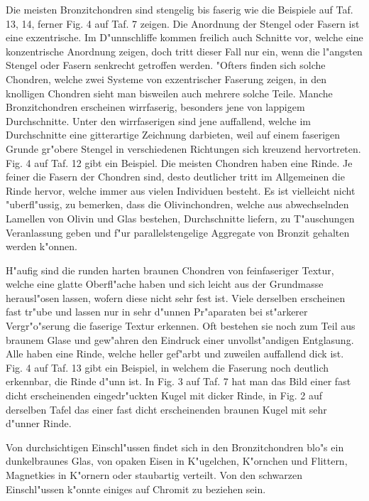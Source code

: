 \documentclass[a4paper, 11pt, oneside, polutonikogreek, german]{article}
\begin{document}
Die meisten Bronzitchondren sind stengelig bis faserig wie die Beispiele auf Taf. 13, 14, ferner Fig. 4 auf Taf. 7 zeigen. Die Anordnung der Stengel oder Fasern ist eine exzentrische. Im D"unnschliffe kommen freilich auch Schnitte vor, welche eine konzentrische Anordnung zeigen, doch tritt dieser Fall nur ein, wenn die l"angsten Stengel oder Fasern senkrecht getroffen werden. "Ofters finden sich solche Chondren, welche zwei Systeme von exzentrischer Faserung zeigen, in den knolligen Chondren sieht man bisweilen auch mehrere solche Teile. Manche Bronzitchondren erscheinen wirrfaserig, besonders jene von lappigem Durchschnitte. Unter den wirrfaserigen sind jene auffallend, welche im Durchschnitte eine gitterartige Zeichnung darbieten, weil auf einem faserigen Grunde gr"obere Stengel in verschiedenen Richtungen sich kreuzend hervortreten. Fig. 4 auf Taf. 12 gibt ein Beispiel. Die meisten Chondren haben eine Rinde. Je feiner die Fasern der Chondren sind, desto deutlicher tritt im Allgemeinen die Rinde hervor, welche immer aus vielen Individuen besteht. Es ist vielleicht nicht "uberfl"ussig, zu bemerken, dass die Olivinchondren, welche aus abwechselnden Lamellen von Olivin und Glas bestehen, Durchschnitte liefern, zu T"auschungen Veranlassung geben und f"ur parallelstengelige Aggregate von Bronzit gehalten werden k"onnen.

H"aufig sind die runden harten braunen Chondren von feinfaseriger Textur, welche eine glatte Oberfl"ache haben und sich leicht aus der Grundmasse herausl"osen lassen, wofern diese nicht sehr fest ist. Viele derselben erscheinen fast tr"ube und lassen nur in sehr d"unnen Pr"aparaten bei st"arkerer Vergr"o"serung die faserige Textur erkennen. Oft bestehen sie noch zum Teil aus braunem Glase und gew"ahren den Eindruck einer unvollst"andigen Entglasung. Alle haben eine Rinde, welche heller gef"arbt und zuweilen auffallend dick ist. Fig. 4 auf Taf. 13 gibt ein Beispiel, in welchem die Faserung noch deutlich erkennbar, die Rinde d"unn ist. In Fig. 3 auf Taf. 7 hat man das Bild einer fast dicht erscheinenden eingedr"uckten Kugel mit dicker Rinde, in Fig. 2 auf derselben Tafel das einer fast dicht erscheinenden braunen Kugel mit sehr d"unner Rinde.

Von durchsichtigen Einschl"ussen findet sich in den Bronzitchondren blo"s ein dunkelbraunes Glas, von opaken Eisen in K"ugelchen, K"ornchen und Flittern, Magnetkies in K"ornern oder staubartig verteilt. Von den schwarzen Einschl"ussen k"onnte einiges auf Chromit zu beziehen sein.
\end{document}
